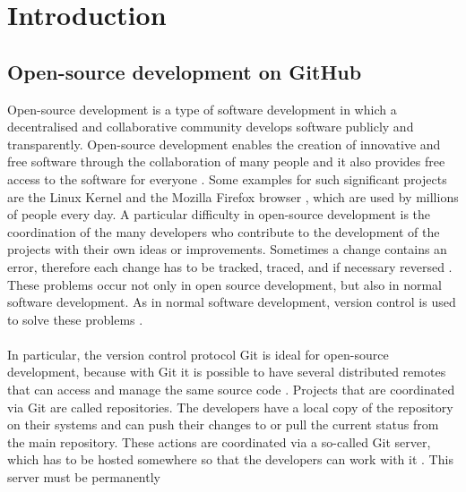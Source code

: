 \documentclass[sigconf]{acmart}
\begin{document}
\maketitle
\pagestyle{plain}


\section{Introduction}
\subsection{Open-source development on GitHub}
Open-source development is a type of software development in which a decentralised and collaborative 
community develops software publicly and transparently. Open-source development enables the creation 
of innovative and free software through the collaboration of many people and it also provides free access 
to the software for everyone \cite{shaikh2017governing, redhat2021ops}. Some examples for such significant 
projects are the Linux Kernel \cite{linux2021ops} and the Mozilla Firefox browser \cite{mozilla2021ops}, which are 
used by millions of people every day. A particular difficulty in open-source development is the coordination of the many 
developers who contribute to the development of the projects with their own ideas or improvements. Sometimes a 
change contains an error, therefore each change has
to be tracked, traced, and if necessary reversed   \cite{shaikh2017governing}. These problems occur not only in open 
source development, but also in normal software development. As in normal software development, version control is 
used to solve these problems \cite{shaikh2017governing, ulrich2020dev}. \\ \\
In particular, the version control protocol Git 
is ideal for open-source development, because with Git it is possible to have several distributed remotes that can 
access and manage the same source code \cite{git2021scm, ulrich2020dev}. Projects that are coordinated via Git are 
called repositories. The developers have a local copy of the repository on their systems and can push their changes to or 
pull the current status from the main repository. These actions are coordinated via a so-called Git server, which has to be 
hosted somewhere so that the developers can work with it \cite{git2021scm}. This server must be permanently
\end{document}
